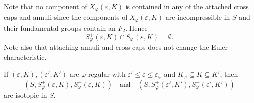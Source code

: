 Note that no component of $X_{\varphi}({\varepsilon},K)$ is contained in any of the attached
cross caps and annuli since the components of $X_{\varphi}({\varepsilon},K)$ are incompressible in $S$
and their fundamental groups contain an $F_2$.
Hence
\begin{equation*}
  S_{\varphi}^+({\varepsilon},K) \cap S_{\varphi}^-({\varepsilon},K) = \emptyset.
\end{equation*}
Note also that attaching annuli and cross caps does not change the Euler characteristic.

\begin{lem}\label{charac}
If $({\varepsilon},K),({\varepsilon}',K')$ are ${\varphi}$-regular with ${\varepsilon}'\le{\varepsilon}\le{\varepsilon}_{\varphi}$
and $K_{\varphi}\subseteq K\subseteq K'$, then
\begin{equation*}
  (S,S_{\varphi}^+({\varepsilon},K),S_{\varphi}^-({\varepsilon},K))
  \quad\text{and}\quad
  (S,S_{\varphi}^+({\varepsilon}',K'),S_{\varphi}^-({\varepsilon}',K'))
\end{equation*}
are isotopic in $S$.
\end{lem}

